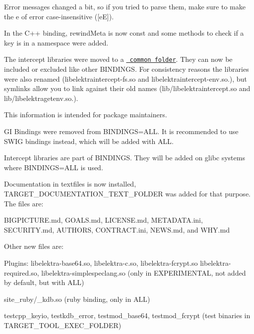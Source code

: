 Error messages changed a bit, so if you tried to parse them, make sure to make the {\ttfamily e} of error case-\/insensitive ({\ttfamily \mbox{[}eE\mbox{]}}).

In the C++ binding, {\ttfamily rewind\+Meta} is now {\ttfamily const} and some methods to check if a key is in a namespace were added.

The intercept libraries were moved to a \href{https://master.libelektra.org/src/bindings/intercept}{\texttt{ common folder}}. They can now be included or excluded like other {\ttfamily B\+I\+N\+D\+I\+N\+GS}. For consistency reasons the libraries were also renamed ({\ttfamily libelektraintercept-\/fs.\+so} and {\ttfamily libelektraintercept-\/env.\+so.}), but symlinks allow you to link against their old names ({\ttfamily lib/libelektraintercept.\+so} and {\ttfamily lib/libelektragetenv.\+so.}).

This information is intended for package maintainers.


\begin{DoxyItemize}
\item GI Bindings were removed from {\ttfamily B\+I\+N\+D\+I\+N\+GS=A\+LL}. It is recommended to use {\ttfamily S\+W\+IG} bindings instead, which will be added with {\ttfamily A\+LL}.
\item Intercept libraries are part of {\ttfamily B\+I\+N\+D\+I\+N\+GS}. They will be added on glibc systems where {\ttfamily B\+I\+N\+D\+I\+N\+GS=A\+LL} is used.
\item Documentation in textfiles is now installed, {\ttfamily T\+A\+R\+G\+E\+T\+\_\+\+D\+O\+C\+U\+M\+E\+N\+T\+A\+T\+I\+O\+N\+\_\+\+T\+E\+X\+T\+\_\+\+F\+O\+L\+D\+ER} was added for that purpose. The files are\+:
\begin{DoxyItemize}
\item {\ttfamily B\+I\+G\+P\+I\+C\+T\+U\+R\+E.\+md}, {\ttfamily G\+O\+A\+L\+S.\+md}, {\ttfamily L\+I\+C\+E\+N\+S\+E.\+md}, {\ttfamily M\+E\+T\+A\+D\+A\+T\+A.\+ini}, {\ttfamily S\+E\+C\+U\+R\+I\+T\+Y.\+md}, {\ttfamily A\+U\+T\+H\+O\+RS}, {\ttfamily C\+O\+N\+T\+R\+A\+C\+T.\+ini}, {\ttfamily N\+E\+W\+S.\+md}, and {\ttfamily W\+H\+Y.\+md}
\end{DoxyItemize}
\end{DoxyItemize}

Other new files are\+:


\begin{DoxyItemize}
\item Plugins\+: {\ttfamily libelektra-\/base64.\+so}, {\ttfamily libelektra-\/c.\+so}, {\ttfamily libelektra-\/fcrypt.\+so} {\ttfamily libelektra-\/required.\+so}, {\ttfamily libelektra-\/simplespeclang.\+so} (only in {\ttfamily E\+X\+P\+E\+R\+I\+M\+E\+N\+T\+AL}, not added by default, but with {\ttfamily A\+LL})
\item {\ttfamily site\+\_\+ruby/\+\_\+kdb.\+so} (ruby binding, only in {\ttfamily A\+LL})
\item {\ttfamily testcpp\+\_\+keyio}, {\ttfamily testkdb\+\_\+error}, {\ttfamily testmod\+\_\+base64}, {\ttfamily testmod\+\_\+fcrypt} (test binaries in {\ttfamily T\+A\+R\+G\+E\+T\+\_\+\+T\+O\+O\+L\+\_\+\+E\+X\+E\+C\+\_\+\+F\+O\+L\+D\+ER})
\end{DoxyItemize}

